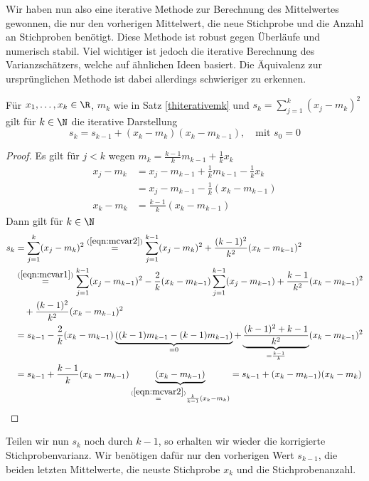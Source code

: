 Wir haben nun also eine iterative Methode zur Berechnung des Mittelwertes gewonnen, die nur den vorherigen Mittelwert, die neue Stichprobe und die Anzahl an Stichproben benötigt. Diese Methode ist robust gegen Überläufe und numerisch stabil. Viel wichtiger ist jedoch die iterative Berechnung des Varianzschätzers, welche auf ähnlichen Ideen basiert. Die Äquivalenz zur ursprünglichen Methode ist dabei allerdings schwieriger zu erkennen.
\begin{maththeorem}
Für $x_1,\dots,x_k\in\R$, $m_k$ wie in Satz \ref{thiterativemk} und $s_k=\sum_{j=1}^k(x_j-m_k)^2$ gilt für $k\in\N$ die iterative Darstellung
\[s_k=s_{k-1}+(x_k-m_k)(x_k-m_{k-1}),\quad\text{mit }s_0=0\]
\end{maththeorem}
\begin{proof}
Es gilt für $j<k$ wegen $m_k=\frac{k-1}{k}m_{k-1}+\frac{1}{k}x_k$
\begin{align}
x_j-m_k&=x_j-m_{k-1}+\frac{1}{k}m_{k-1}-\frac{1}{k}x_k \nonumber\\
\label{eqn:mcvar1}
&=x_j-m_{k-1}-\frac{1}{k}(x_k-m_{k-1})\tag{*}\\
\label{eqn:mcvar2}
x_k-m_k&=\frac{k-1}{k}(x_k-m_{k-1})\tag{**}
\end{align}
Dann gilt für $k\in\N$
\begin{align*}
s_k&=\sum_{j=1}^k(x_j-m_k)^2\stackrel{(\ref{eqn:mcvar2})}{=}\sum_{j=1}^{k-1}(x_j-m_k)^2+\frac{(k-1)^2}{k^2}(x_k-m_{k-1})^2\\
&\stackrel{(\ref{eqn:mcvar1})}{=}\sum_{j=1}^{k-1}(x_j-m_{k-1})^2-\frac{2}{k}(x_k-m_{k-1})\sum_{j=1}^{k-1}(x_j-m_{k-1})+\frac{k-1}{k^2}(x_k-m_{k-1})^2\\
&\quad +\frac{(k-1)^2}{k^2}(x_k-m_{k-1})^2\\
&=s_{k-1}-\frac{2}{k}(x_k-m_{k-1})\underbrace{\left((k-1)m_{k-1}-(k-1)m_{k-1}\right)}_{=0}+\underbrace{\frac{(k-1)^2+k-1}{k^2}}_{=\frac{k-1}{k}}(x_k-m_{k-1})^2\\
&=s_{k-1}+\frac{k-1}{k}(x_k-m_{k-1})\underbrace{(x_k-m_{k-1})}_{\stackrel{(\ref{eqn:mcvar2})}{=}\frac{k}{k-1}(x_k-m_k)}=s_{k-1}+(x_k-m_{k-1})(x_k-m_k)
\end{align*}
\end{proof}
Teilen wir nun $s_k$ noch durch $k-1$, so erhalten wir wieder die korrigierte Stichprobenvarianz. Wir benötigen dafür nur den vorherigen Wert $s_{k-1}$, die beiden letzten Mittelwerte, die neuste Stichprobe $x_k$ und die Stichprobenanzahl.
